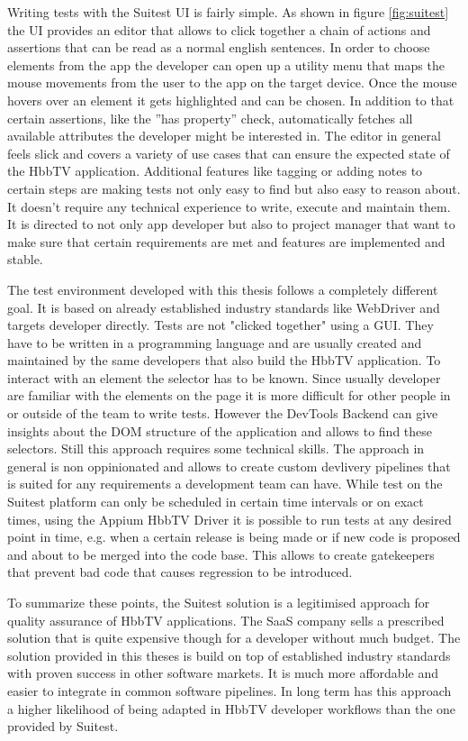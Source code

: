 Writing tests with the Suitest UI is fairly simple. As shown in figure \ref{fig:suitest} the UI provides an editor
that allows to click together a chain of actions and assertions that can be read as a normal english sentences. In
order to choose elements from the app the developer can open up a utility menu that maps the mouse movements from the
user to the app on the target device. Once the mouse hovers over an element it gets highlighted and can be chosen.
In addition to that certain assertions, like the ''has property'' check, automatically fetches all available attributes
the developer might be interested in. The editor in general feels slick and covers a variety of use cases that can
ensure the expected state of the HbbTV application. Additional features like tagging or adding notes to certain steps
are making tests not only easy to find but also easy to reason about. It doesn't require any technical experience
to write, execute and maintain them. It is directed to not only app developer but also to project manager that want
to make sure that certain requirements are met and features are implemented and stable.

The test environment developed with this thesis follows a completely different goal. It is based on already established
industry standards like WebDriver and targets developer directly. Tests are not "clicked together" using a GUI. They have
to be written in a programming language and are usually created and maintained by the same developers that also build
the HbbTV application. To interact with an element the selector has to be known. Since usually developer are familiar
with the elements on the page it is more difficult for other people in or outside of the team to write tests. However
the DevTools Backend can give insights about the DOM structure of the application and allows to find these selectors.
Still this approach requires some technical skills. The approach in general is non oppinionated and allows to create
custom devlivery pipelines that is suited for any requirements a development team can have. While test on the Suitest
platform can only be scheduled in certain time intervals or on exact times, using the Appium HbbTV Driver it is
possible to run tests at any desired point in time, e.g. when a certain release is being made or if new code is
proposed and about to be merged into the code base. This allows to create gatekeepers that prevent bad code that
causes regression to be introduced.

To summarize these points, the Suitest solution is a legitimised approach for quality assurance of HbbTV applications.
The SaaS company sells a prescribed solution that is quite expensive though for a developer without much budget. The
solution provided in this theses is build on top of established industry standards with proven success in other
software markets. It is much more affordable and easier to integrate in common software pipelines. In long term has this
approach a higher likelihood of being adapted in HbbTV developer workflows than the one provided by Suitest.
